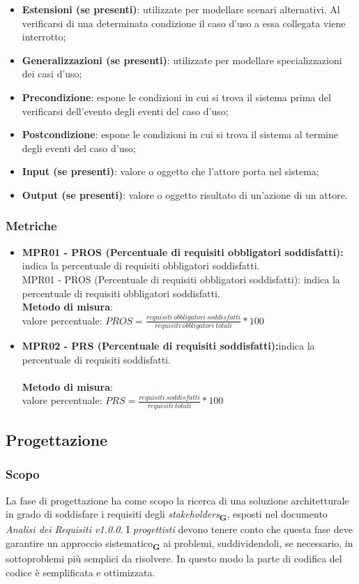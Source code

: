 \begin{itemize}
    \item \textbf{Estensioni (se presenti)}: utilizzate per modellare scenari alternativi. Al verificarsi di una determinata condizione il caso d'uso a essa collegata viene interrotto;
    \item \textbf{Generalizzazioni (se presenti)}: utilizzate per modellare specializzazioni dei casi d'uso;
    \item \textbf{Precondizione}: espone le condizioni in cui si trova il sistema prima del verificarsi dell'evento degli eventi del caso d'uso;
    \item \textbf{Postcondizione}: espone le condizioni in cui si trova il sistema al termine degli eventi del caso d'uso;
    \item \textbf{Input (se presenti)}: valore o oggetto che l'attore porta nel sistema;
    \item \textbf{Output (se presenti)}: valore o oggetto risultato di un'azione di un attore.
\end{itemize}
\subsubsection{Metriche}
\begin{itemize}
    \item \textbf{MPR01 - PROS (Percentuale di requisiti obbligatori soddisfatti):} indica la percentuale di requisiti obbligatori soddisfatti.\\
    MPR01 - PROS (Percentuale di requisiti obbligatori soddisfatti): indica la percentuale di requisiti obbligatori soddisfatti.
    \\\textbf{Metodo di misura}:\\valore percentuale: $PROS = \frac{requisiti \ obbligatori \ soddisfatti}{requisiti \ obbligatori \ totali} * 100$
    \item \textbf{MPR02 - PRS (Percentuale di requisiti soddisfatti):}indica la percentuale di requisiti soddisfatti.\\
    \\\textbf{Metodo di misura}:\\valore percentuale: $PRS = \frac{requisiti \ soddisfatti}{requisiti \ totali} * 100$
\end{itemize}
\subsection{Progettazione}
\subsubsection{Scopo}
La fase di progettazione ha come scopo la ricerca di una soluzione architetturale in grado di soddisfare i requisiti degli \textit{stakeholders}\textsubscript{\textbf{G}}, esposti nel documento \textit{Analisi dei Requisiti v1.0.0}.
I \textit{progettisti} devono tenere conto che questa fase deve garantire un approccio sistematico\textsubscript{\textbf{G}} ai problemi, suddividendoli, se necessario, in sottoproblemi più semplici da risolvere.
In questo modo la parte di codifica del codice è semplificata e ottimizzata.
